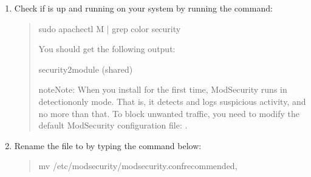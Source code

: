 \documentclass[a4paper,10pt,english,openany,oneside]{sphinxmanual}
\begin{document}
\begin{sloppypar}
\begin{enumerate}
\begin{quote}
\begin{sphinxVerbatim}[commandchars=\\\{\}]
\PYGZdl{} sudo apt install lib\PYGZhy{}apache2\PYGZhy{}mod\PYGZhy{}security2
\end{sphinxVerbatim}
\end{quote}

\item {} 
\sphinxAtStartPar
Check if  is up and running on your system by running the command:
\begin{quote}

\begin{sphinxVerbatim}[commandchars=\\\{\}]
\PYGZdl{} sudo apachectl \PYGZhy{}M | grep \PYGZhy{}\PYGZhy{}color security
\end{sphinxVerbatim}

\sphinxAtStartPar
You should get the following output:

\begin{sphinxVerbatim}[commandchars=\\\{\}]
\PYGZdl{} security2\PYGZus{}module (shared)
\end{sphinxVerbatim}

\begin{sphinxadmonition}{note}{Note:}
\sphinxAtStartPar
When you install  for the first time, ModSecurity runs in detection\sphinxhyphen{}only mode. That is, it detects and logs suspicious activity, and no more than that. To block unwanted traffic, you need to modify the default ModSecurity configuration file: .
\end{sphinxadmonition}
\end{quote}

\item {} 
\sphinxAtStartPar
Rename the file  to  by typing the command below:
\begin{quote}

\begin{sphinxVerbatim}[commandchars=\\\{\}]
\PYGZdl{} mv /etc/modsecurity/modsecurity.conf\PYGZob{}\PYGZhy{}recommended,\PYGZcb{}
\end{sphinxVerbatim}
\end{quote}


\end{enumerate}
\end{sloppypar}
\end{document}
